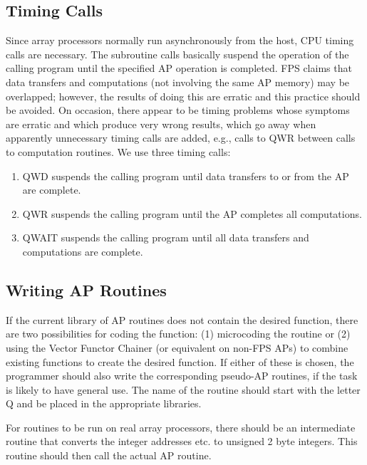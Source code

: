 \subsection{Timing Calls }
Since array processors normally run asynchronously from the host, CPU
timing calls are necessary.  The subroutine calls basically suspend
the operation of the calling program until the specified AP operation
is completed.  FPS claims that data transfers and computations (not
involving the same AP memory) may be overlapped; however, the results
of doing this are erratic and this practice should be avoided. On
occasion, there appear to be timing problems whose symptoms are
erratic and which produce very wrong results, which go away when
apparently unnecessary timing calls are added, e.g., calls to QWR
between calls to computation routines. We use three timing calls:
\begin{enumerate} %
\item QWD suspends the calling program until data transfers to or from the
AP are complete.
\item QWR suspends the calling program until the AP completes all
computations.
\item QWAIT suspends the calling program until all data transfers and
computations are complete.

\end{enumerate} %

\subsection{Writing AP Routines }
If the current library of AP routines does not contain the desired
function, there are two possibilities for coding the function: (1)
microcoding the routine or (2) using the Vector Functor Chainer (or
equivalent on non-FPS APs) to combine existing functions to create the
desired function.  If either of these is chosen, the programmer should
also write the corresponding pseudo-AP routines, if the task is likely
to have general use.  The name of the routine should start with the
letter Q and be placed in the appropriate libraries.

   For routines to be run on real array processors, there should be an
intermediate routine that converts the integer addresses etc. to
unsigned 2 byte integers.  This routine should then call the actual AP
routine.

